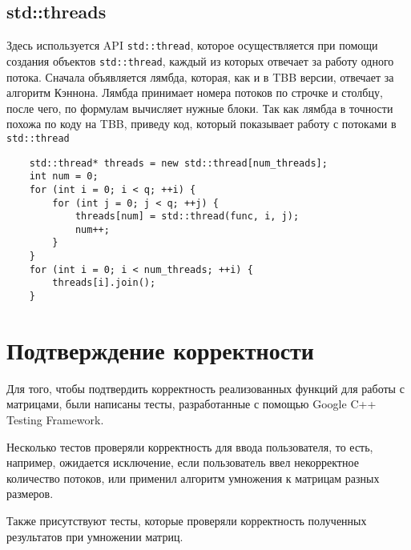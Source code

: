 \documentclass{report}
\begin{document}
\subsection{std::threads}
Здесь используется API \verb|std::thread|, которое осуществляется при помощи создания объектов \verb|std::thread|, каждый из которых отвечает за работу одного потока.
Сначала объявляется лямбда, которая, как и в TBB версии, отвечает за алгоритм Кэннона. Лямбда принимает номера потоков по строчке и столбцу, после чего, по формулам вычисляет нужные блоки. Так как лямбда в точности похожа по коду на TBB, приведу код, который показывает работу с потоками в \verb|std::thread|
\begin{lstlisting}
    std::thread* threads = new std::thread[num_threads];
    int num = 0;
    for (int i = 0; i < q; ++i) {
        for (int j = 0; j < q; ++j) {
            threads[num] = std::thread(func, i, j);
            num++;
        }
    }
    for (int i = 0; i < num_threads; ++i) {
        threads[i].join();
    }
\end{lstlisting}

\newpage

\section{\hspace{0.6cm}Подтверждение корректности}
Для того, чтобы подтвердить корректность реализованных функций для работы с матрицами, были написаны тесты, разработанные с помощью Google C++ Testing Framework.

Несколько тестов проверяли корректность для ввода пользователя, то есть, например, ожидается исключение, если пользователь ввел некорректное количество потоков, или применил алгоритм умножения к матрицам разных размеров.

Также присутствуют тесты, которые проверяли корректность полученных результатов при умножении матриц.

\newpage
\end{document}
